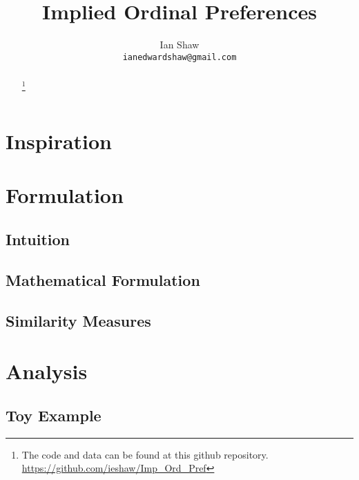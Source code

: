 \documentclass{article}
\title{Implied Ordinal Preferences}
\author{Ian Shaw \\ \texttt{ianedwardshaw@gmail.com}}
\begin{document}
\maketitle

\begin{abstract}

\footnote{The code and data can be found at this github repository. \url{https://github.com/ieshaw/Imp_Ord_Pref}}
\end{abstract}


\newpage

\tableofcontents

\newpage

\section{Inspiration}



\section{Formulation}

\subsection{Intuition}



\subsection{Mathematical Formulation}



\subsection{Similarity Measures}



\section{Analysis}

\subsection{Toy Example}


\end{document}
